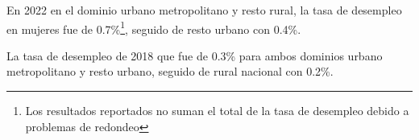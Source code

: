 En 2022 en el dominio urbano metropolitano y resto rural, la tasa de desempleo en mujeres fue de 0.7\%\footnote{Los resultados reportados no suman el total de la tasa de desempleo debido a problemas de redondeo}, seguido de resto urbano con 0.4\%.

La tasa de desempleo de 2018 que fue de 0.3\% para ambos dominios urbano metropolitano y resto urbano, seguido de rural nacional con 0.2\%. 
